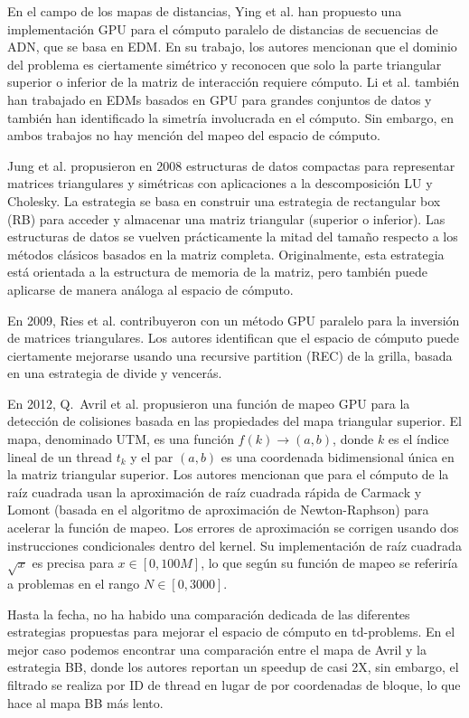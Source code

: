 \documentclass[twocolumn,10pt,a4paper]{article}
\begin{document}
En el campo de los mapas de distancias, Ying et al. han propuesto una
implementación GPU para el cómputo paralelo de distancias de secuencias de
ADN, que se basa en EDM. En su trabajo, los autores mencionan
que el dominio del problema es ciertamente simétrico y reconocen que solo la
parte triangular superior o inferior de la matriz de interacción requiere
cómputo. Li et al. también han trabajado en EDMs basados en GPU
para grandes conjuntos de datos y también han identificado la simetría
involucrada en el cómputo. Sin embargo, en ambos trabajos no hay mención del
mapeo del espacio de cómputo.

Jung et al. propusieron en 2008 estructuras de datos compactas
para representar matrices triangulares y simétricas con aplicaciones a la
descomposición LU y Cholesky. La estrategia se basa en construir
una estrategia de rectangular box (RB) para acceder y almacenar una matriz
triangular (superior o inferior). Las estructuras de datos se vuelven
prácticamente la mitad del tamaño respecto a los métodos clásicos basados en
la matriz completa. Originalmente, esta estrategia está orientada a la
estructura de memoria de la matriz, pero también puede aplicarse de manera
análoga al espacio de cómputo.

En 2009, Ries et al. contribuyeron con un método GPU paralelo para la
inversión de matrices triangulares. Los autores identifican que
el espacio de cómputo puede ciertamente mejorarse usando una recursive
partition (REC) de la grilla, basada en una estrategia de divide y vencerás.

En 2012, Q.~Avril et al. propusieron una función de mapeo GPU para la
detección de colisiones basada en las propiedades del mapa triangular superior. El mapa, denominado UTM, es una función
$f(k) \rightarrow (a, b)$, donde $k$ es el índice lineal de un thread $t_k$
y el par $(a, b)$ es una coordenada bidimensional única en la matriz
triangular superior. Los autores mencionan que para el cómputo de la raíz
cuadrada usan la aproximación de raíz cuadrada rápida de Carmack y Lomont
(basada en el algoritmo de aproximación de Newton-Raphson) para
acelerar la función de mapeo. Los errores de aproximación se corrigen
usando dos instrucciones condicionales dentro del kernel. Su implementación
de raíz cuadrada $\sqrt{x}$ es precisa para $x \in [0, 100M]$, lo que según
su función de mapeo se referiría a problemas en el rango $N \in [0, 3000]$.

Hasta la fecha, no ha habido una comparación dedicada de las diferentes
estrategias propuestas para mejorar el espacio de cómputo en td-problems. En
el mejor caso podemos encontrar una comparación entre el mapa de Avril y la
estrategia BB, donde los autores reportan un speedup de casi 2X,
sin embargo, el filtrado se realiza por ID de thread en lugar de por
coordenadas de bloque, lo que hace al mapa BB más lento.
\end{document}
